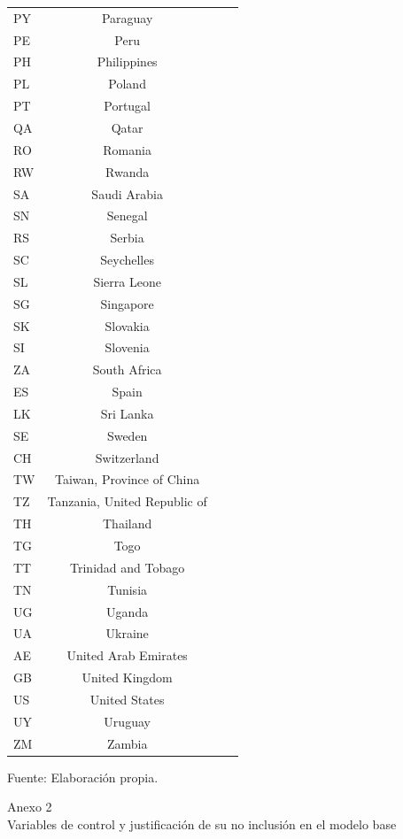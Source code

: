 \documentclass[12pt,a4paper]{article}
\begin{document}
\begin{flushleft}
\begin{longtable}{lccc}
PY & Paraguay &  &  \\
PE & Peru &  &  \\
PH & Philippines &  &  \\
PL & Poland &  &  \\
PT & Portugal &  &  \\
QA & Qatar &  &  \\
RO & Romania &  &  \\
RW & Rwanda &  &  \\
SA & Saudi Arabia &  &  \\
SN & Senegal &  &  \\
RS & Serbia &  &  \\
SC & Seychelles &  &  \\
SL & Sierra Leone &  &  \\
SG & Singapore &  &  \\
SK & Slovakia &  &  \\
SI & Slovenia &  &  \\
ZA & South Africa &  &  \\
ES & Spain &  &  \\
LK & Sri Lanka &  &  \\
SE & Sweden &  &  \\
CH & Switzerland &  &  \\
TW & Taiwan, Province of China &  &  \\
TZ & Tanzania, United Republic of &  &  \\
TH & Thailand &  &  \\
TG & Togo &  &  \\
TT & Trinidad and Tobago &  &  \\
TN & Tunisia &  &  \\
UG & Uganda &  &  \\
UA & Ukraine &  &  \\
AE & United Arab Emirates &  &  \\
GB & United Kingdom &  &  \\
US & United States &  &  \\
UY & Uruguay &  &  \\
ZM & Zambia &  &  \\
\bottomrule
\end{longtable}
\begin{minipage}{\linewidth}\smallskip\footnotesize Fuente: Elaboración propia.\end{minipage}

\end{flushleft}

\clearpage
{}
\label{anexo:2}
{\noindent Anexo 2}\\[4pt]
{\noindent Variables de control y justificación de su no inclusión en el modelo base}
\end{document}
